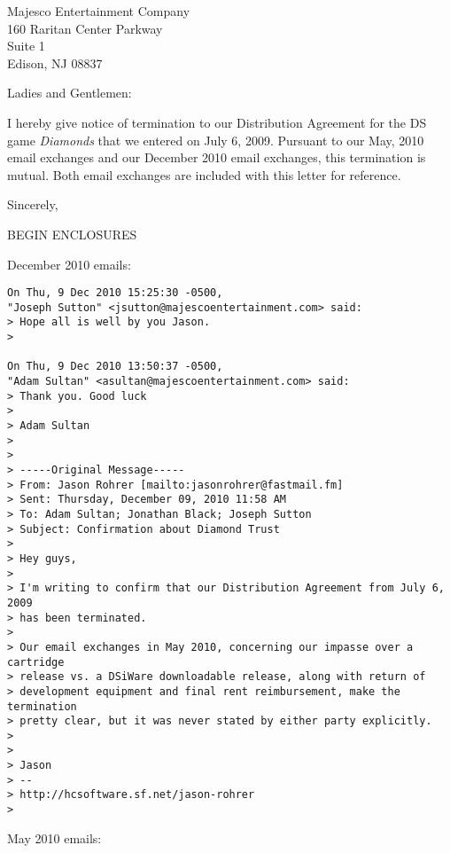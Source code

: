 \documentclass[12pt]{letter}
\begin{document}
\begin{letter}{Majesco Entertainment Company\\160 Raritan Center Parkway\\Suite 1\\Edison, NJ 08837}

\address{1941 Calle de Suenos\\Las Cruces, NM 88001}

\signature{Jason Rohrer}


\opening{Ladies and Gentlemen:}

I hereby give notice of termination to our Distribution Agreement for the DS game {\it Diamonds} that we entered on July 6, 2009.  Pursuant to our May, 2010 email exchanges and our December 2010 email exchanges, this termination is mutual.  Both email exchanges are included with this letter for reference.

\closing{Sincerely,}


\end{letter}


BEGIN ENCLOSURES



December 2010 emails:

{\small
\begin{verbatim}
On Thu, 9 Dec 2010 15:25:30 -0500, 
"Joseph Sutton" <jsutton@majescoentertainment.com> said:
> Hope all is well by you Jason.
> 

On Thu, 9 Dec 2010 13:50:37 -0500, 
"Adam Sultan" <asultan@majescoentertainment.com> said:
> Thank you. Good luck
> 
> Adam Sultan
> 
> 
> -----Original Message-----
> From: Jason Rohrer [mailto:jasonrohrer@fastmail.fm] 
> Sent: Thursday, December 09, 2010 11:58 AM
> To: Adam Sultan; Jonathan Black; Joseph Sutton
> Subject: Confirmation about Diamond Trust
> 
> Hey guys,
> 
> I'm writing to confirm that our Distribution Agreement from July 6, 2009
> has been terminated.
> 
> Our email exchanges in May 2010, concerning our impasse over a cartridge
> release vs. a DSiWare downloadable release, along with return of
> development equipment and final rent reimbursement, make the termination
> pretty clear, but it was never stated by either party explicitly.
> 
> 
> Jason
> -- 
> http://hcsoftware.sf.net/jason-rohrer
> 
\end{verbatim}
}


\newpage

May 2010 emails:
\end{document}
